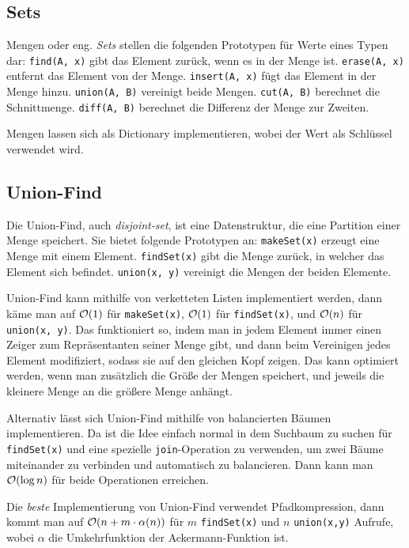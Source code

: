 \subsection{Sets}
Mengen oder eng. \emph{Sets} stellen die folgenden Prototypen für Werte eines Typen dar:
\lstinline|find(A, x)| gibt das Element zurück, wenn es in der Menge ist.
\lstinline|erase(A, x)| entfernt das Element von der Menge.
\lstinline|insert(A, x)| fügt das Element in der Menge hinzu.
\lstinline|union(A, B)| vereinigt beide Mengen.
\lstinline|cut(A, B)| berechnet die Schnittmenge.
\lstinline|diff(A, B)| berechnet die Differenz der Menge zur Zweiten.

Mengen lassen sich als Dictionary implementieren, wobei der Wert als Schlüssel verwendet wird.

\subsection{Union-Find}
Die Union-Find, auch \emph{disjoint-set}, ist eine Datenstruktur, die eine Partition einer Menge speichert.
Sie bietet folgende Prototypen an:
\lstinline|makeSet(x)| erzeugt eine Menge mit einem Element.
\lstinline|findSet(x)| gibt die Menge zurück, in welcher das Element sich befindet.
\lstinline|union(x, y)| vereinigt die Mengen der beiden Elemente.

Union-Find kann mithilfe von verketteten Listen implementiert werden, dann käme man auf \(\mathcal O(1)\) für \lstinline|makeSet(x)|, \(\mathcal O(1)\) für \lstinline|findSet(x)|, und \(\mathcal O(n)\) für \lstinline|union(x, y)|.
Das funktioniert so, indem man in jedem Element immer einen Zeiger zum Repräsentanten seiner Menge gibt, und dann beim Vereinigen jedes Element modifiziert, sodass sie auf den gleichen Kopf zeigen.
Das kann optimiert werden, wenn man zusätzlich die Größe der Mengen speichert, und jeweils die kleinere Menge an die größere Menge anhängt.

Alternativ lässt sich Union-Find mithilfe von balancierten Bäumen implementieren.
Da ist die Idee einfach normal in dem Suchbaum zu suchen für \lstinline|findSet(x)| und eine spezielle \lstinline|join|-Operation zu verwenden, um zwei Bäume miteinander zu verbinden und automatisch zu balancieren.
Dann kann man \(\mathcal O(\log n)\) für beide Operationen erreichen.

Die \emph{beste} Implementierung von Union-Find verwendet Pfadkompression, dann kommt man auf \(\mathcal O(n + m \cdot \alpha(n))\) für \(m\) \lstinline|findSet(x)| und \(n\) \lstinline|union(x,y)| Aufrufe, wobei \(\alpha\) die Umkehrfunktion der Ackermann-Funktion ist.

